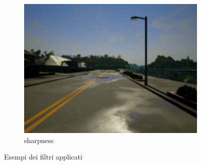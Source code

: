 \documentclass[14pt]{extarticle}
\begin{document}
\begin{figure}
\begin{subfigure}[b]{0.3\textwidth}
			\includegraphics[scale=0.1]{./foto_sporcature/sharpness.png}
	         \caption{sharpness}
	         \label{fig:sharpness}
	     \end{subfigure}
	        \caption{Esempi dei filtri applicati}
	        \label{fig:Esempi dei filtri applicati}
	\end{figure}
\end{document}
